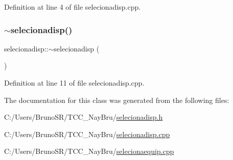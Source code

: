 Definition at line 4 of file selecionadisp.\+cpp.

\hypertarget{classselecionadisp_aad8dcaadb86038322f173c9b9203916e}{}\label{classselecionadisp_aad8dcaadb86038322f173c9b9203916e} 
\subsubsection{\texorpdfstring{$\sim$selecionadisp()}{~selecionadisp()}}
{\footnotesize\ttfamily selecionadisp\+::$\sim$selecionadisp (\begin{DoxyParamCaption}{ }\end{DoxyParamCaption})}



Definition at line 11 of file selecionadisp.\+cpp.



The documentation for this class was generated from the following files\+:\begin{DoxyCompactItemize}
\item 
C\+:/\+Users/\+Bruno\+S\+R/\+T\+C\+C\+\_\+\+Nay\+Bru/\hyperlink{selecionadisp_8h}{selecionadisp.\+h}\item 
C\+:/\+Users/\+Bruno\+S\+R/\+T\+C\+C\+\_\+\+Nay\+Bru/\hyperlink{selecionadisp_8cpp}{selecionadisp.\+cpp}\item 
C\+:/\+Users/\+Bruno\+S\+R/\+T\+C\+C\+\_\+\+Nay\+Bru/\hyperlink{selecionaequip_8cpp}{selecionaequip.\+cpp}\end{DoxyCompactItemize}

